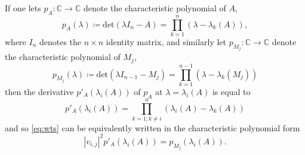 \documentclass[12pt]{amsart}
\newcommand\C{\mathbb{C}}
\begin{document}
If one lets $p_A: \C \to \C$ denote the characteristic polynomial of $A$,
\begin{equation}\label{pa-def}
 p_A(\lambda) \coloneqq \mathrm{det}(\lambda I_n - A) = \prod_{k=1}^n (\lambda - \lambda_k(A)),
\end{equation}
where $I_n$ denotes the $n \times n$ identity matrix, and similarly let $p_{M_j}: \C \to \C$ denote the characteristic polynomial of $M_j$,
$$ p_{M_j}(\lambda) \coloneqq \mathrm{det}(\lambda I_{n-1} - M_j) = \prod_{k=1}^{n-1} (\lambda - \lambda_k(M_j))$$
then the derivative $p'_A(\lambda_i(A))$ of $p_A$ at $\lambda = \lambda_i(A)$ is equal to
$$ p'_A(\lambda_i(A)) = \prod_{k=1;k\neq i}^{n}\left(\lambda_i(A)-\lambda_k(A)\right)$$
and so \eqref{eq:wts} can be equivalently written in the characteristic polynomial form
\begin{equation}\label{eq:wts-alt}
|v_{i,j}|^2 p'_A(\lambda_i(A))  = p_{M_j}(\lambda_i(A)).
\end{equation}
\end{document}
